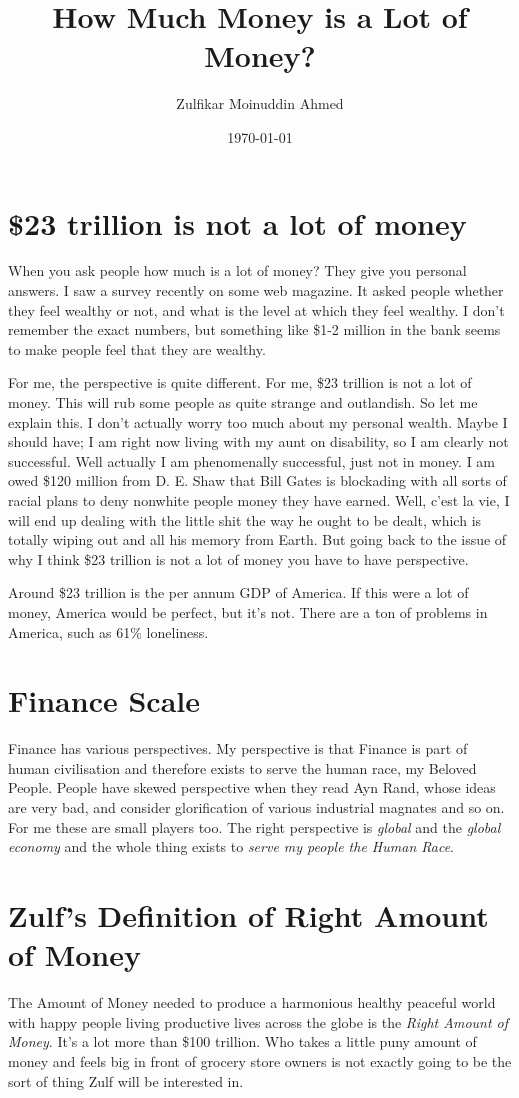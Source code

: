 \documentclass{amsart}
\title{How Much Money is a Lot of Money?}
\author{Zulfikar Moinuddin Ahmed}
\date{\today}
\begin{document}
\maketitle

\section{\$23 trillion is not a lot of money}

When you ask people how much is a lot of money?  They give you personal answers.  I saw a survey recently on some web magazine.  It asked people whether they feel wealthy or not, and what is the level at which they feel wealthy.  I don't remember the exact numbers, but something like \$1-2 million in the bank seems to make people feel that they are wealthy.

For me, the perspective is quite different.  For me, \$23 trillion is not a lot of money.  This will rub some people as quite strange and outlandish.  So let me explain this.  I don't actually worry too much about my personal wealth.  Maybe I should have; I am right now living with my aunt on disability, so I am clearly not successful.  Well actually I am phenomenally successful, just not in money.  I am owed \$120 million from D. E. Shaw that Bill Gates is blockading with all sorts of racial plans to deny nonwhite people money they have earned.  Well, c'est la vie, I will end up dealing with the little shit the way he ought to be dealt, which is totally wiping out and all his memory from Earth.  But going back to the issue of why I think \$23 trillion is not a lot of money you have to have perspective. 

Around \$23 trillion is the per annum GDP of America.  If this were a lot of money, America would be perfect, but it's not.  There are a ton of problems in America, such as 61\% loneliness.  

\section{Finance Scale}

Finance has various perspectives. My perspective is that Finance is part of human civilisation and therefore exists to serve the human race, my Beloved People.  People have skewed perspective when they read Ayn Rand, whose ideas are very bad, and consider glorification of various industrial magnates and so on.  For me these are small players too.  The right perspective is {\em global} and the {\em global economy} and the whole thing exists to {\em serve my people the Human Race}. 

\section{Zulf's Definition of Right Amount of Money}

The Amount of Money needed to produce a harmonious healthy peaceful world with happy people living productive lives across the globe is the {\em Right Amount of Money}.  It's a lot more than \$100 trillion.  Who takes a little puny amount of money and feels big in front of grocery store owners is not exactly going to be the sort of thing Zulf will be interested in.
 
\end{document}
